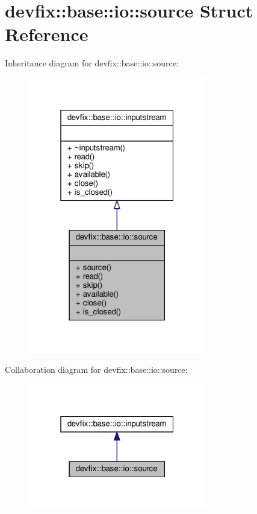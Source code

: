 \hypertarget{structdevfix_1_1base_1_1io_1_1source}{}\section{devfix\+:\+:base\+:\+:io\+:\+:source Struct Reference}
\label{structdevfix_1_1base_1_1io_1_1source}


Inheritance diagram for devfix\+:\+:base\+:\+:io\+:\+:source\+:\nopagebreak
\begin{figure}[H]
\begin{center}
\leavevmode
\includegraphics[width=220pt]{structdevfix_1_1base_1_1io_1_1source__inherit__graph}
\end{center}
\end{figure}


Collaboration diagram for devfix\+:\+:base\+:\+:io\+:\+:source\+:\nopagebreak
\begin{figure}[H]
\begin{center}
\leavevmode
\includegraphics[width=220pt]{structdevfix_1_1base_1_1io_1_1source__coll__graph}
\end{center}
\end{figure}

